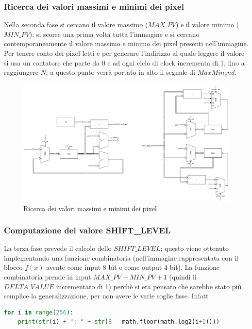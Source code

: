 \documentclass[11pt]{article} %
\begin{document}
\subsubsection{Ricerca dei valori massimi e minimi dei pixel}
Nella seconda fase si cercano il valore massimo ($MAX\_PV$) e il valore minimo ($MIN\_PV$): si scorre una prima volta tutta l'immagine e si cercano contemporaneamente il valore massimo e minimo dei pixel presenti nell'immagine. Per tenere conto dei pixel letti e per generare l'indirizzo al quale leggere il valore si usa un contatore che parte da 0 e ad ogni ciclo di clock incrementa di 1, fino a raggiungere $N$; a questo punto verrà portato in alto il segnale di $MaxMin_end$.

\begin{figure}[ht!]
\centering
\includegraphics[width=120mm]{datapaths/regMax_regMin.png}
\caption{Ricerca dei valori massimi e minimi dei pixel}
\end{figure}


\subsubsection{Computazione del valore SHIFT\_LEVEL}
La terza fase prevede il calcolo dello $SHIFT\_LEVEL$; questo viene ottenuto implementando una funzione combinatoria (nell'immagine rappresentata con il blocco $f(x)$ avente come input 8 bit e come output 4 bit). La funzione combinatoria prende in input $MAX\_PV - MIN\_PV + 1$ (quindi il $DELTA\_VALUE$ incrementato di 1) perchè si era pensato che sarebbe stato più semplice la generalizzazione, per non avere le varie soglie fisse. Infatt

	\begin{lstlisting}[language=Python, caption=Generazione di soglie]
for i in range(256):
	print(str(i) + ": " + str(8 - math.floor(math.log2(i+1))))
	\end{lstlisting}
\end{document}

